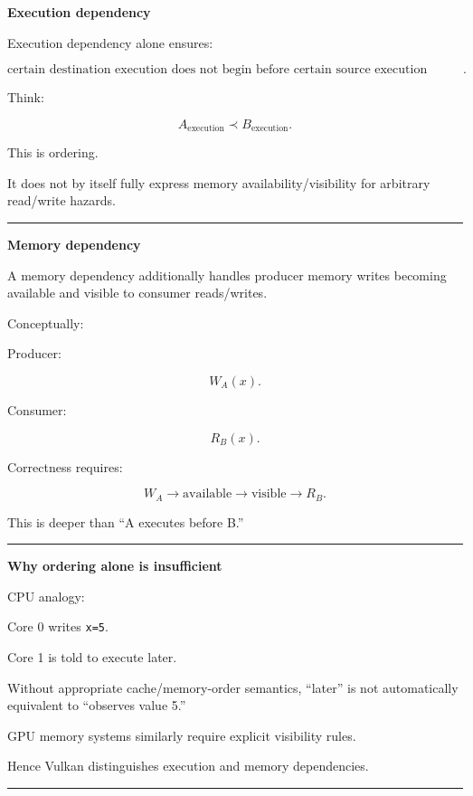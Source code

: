 \textbf{Execution dependency}

Execution dependency alone ensures:

\[
\boxed{
\text{certain destination execution does not begin before certain source execution reaches the required point}.
}
\]

Think:

\[
A_{\text{execution}}
\prec
B_{\text{execution}}.
\]

This is ordering.

It does not by itself fully express memory availability/visibility for arbitrary read/write hazards.

\begin{center}\rule{0.5\linewidth}{0.5pt}\end{center}

\textbf{Memory dependency}

A memory dependency additionally handles producer memory writes becoming available and visible to consumer reads/writes.

Conceptually:

Producer:

\[
W_A(x).
\]

Consumer:

\[
R_B(x).
\]

Correctness requires:

\[
\boxed{
W_A
\rightarrow
\text{available}
\rightarrow
\text{visible}
\rightarrow
R_B.
}
\]

This is deeper than ``A executes before B.''

\begin{center}\rule{0.5\linewidth}{0.5pt}\end{center}

\textbf{Why ordering alone is insufficient}

CPU analogy:

Core 0 writes \texttt{x=5}.

Core 1 is told to execute later.

Without appropriate cache/memory-order semantics, ``later'' is not automatically equivalent to ``observes value 5.''

GPU memory systems similarly require explicit visibility rules.

Hence Vulkan distinguishes execution and memory dependencies.

\begin{center}\rule{0.5\linewidth}{0.5pt}\end{center}

